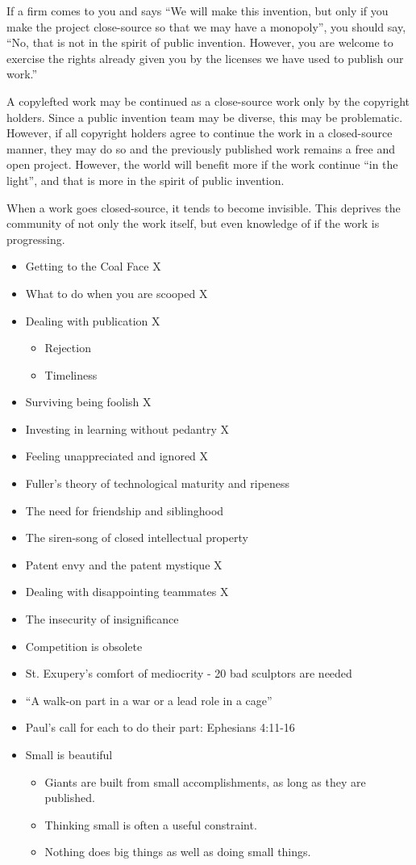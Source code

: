 \documentclass[
	fontsize=10pt, %
	twoside=false, %
	secnumdepth=1, %
]{kaobook}
\begin{document}
If a firm comes to you and says
``We will make this invention, but only
if you make the project close-source so
that we may have a monopoly'', you should
say, ``No, that is not in the spirit of public invention.
However, you are welcome to exercise the rights
already given you by the licenses we have used to
publish our work.''

A copylefted work may be continued as a
close-source work only by the copyright holders.
Since a public invention team may be diverse,
this may be problematic. However, if all copyright
holders agree to continue the work in a closed-source
manner, they may do so and the previously published
work remains a free and open project.
However, the world will benefit more if the
work continue ``in the light'', and that
is more in the spirit of public invention.

When a work goes closed-source, it tends
to become invisible.
This deprives the community of not
only the work itself, but even knowledge of if the work is
progressing.

\begin{itemize}
\item Getting to the Coal Face X
\item What to do when you are scooped X
\item Dealing with publication X
  \begin{itemize}
\item Rejection
\item Timeliness
\end{itemize}
\item Surviving being foolish X
\item Investing in learning without pedantry X
\item Feeling unappreciated and ignored X
\item Fuller’s theory of technological maturity and ripeness
\item The need for friendship and siblinghood
\item The siren-song of closed intellectual property
\item Patent envy and the patent mystique X
\item Dealing with disappointing teammates X
\item The insecurity of insignificance
\item Competition is obsolete
\item St. Exupery’s comfort of mediocrity - 20 bad sculptors are needed
\item “A walk-on part in a war or a lead role in a cage”
\item Paul’s call for each to do their part: Ephesians 4:11-16
\item Small is beautiful
  \begin{itemize}
\item Giants are built from small accomplishments, as long as they are published.
\item Thinking small is often a useful constraint.
\item Nothing does big things as well as doing small things.
\end{itemize}
\end{itemize}
\end{document}

